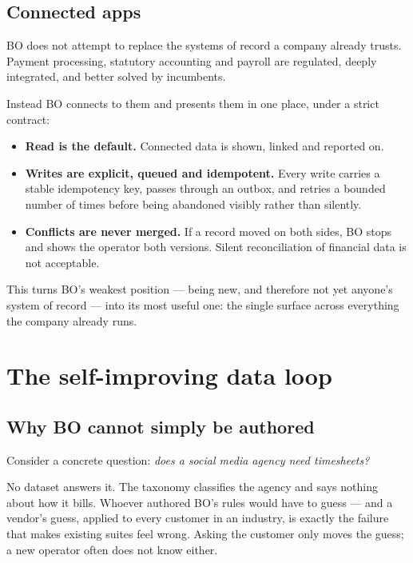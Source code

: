 \documentclass[11pt,a4paper]{article}
\begin{document}
\subsection{Connected apps}

BO does not attempt to replace the systems of record a company already trusts. Payment processing,
statutory accounting and payroll are regulated, deeply integrated, and better solved by incumbents.

Instead BO connects to them and presents them in one place, under a strict contract:

\begin{itemize}[leftmargin=1.4em,itemsep=2pt]
  \item \textbf{Read is the default.} Connected data is shown, linked and reported on.
  \item \textbf{Writes are explicit, queued and idempotent.} Every write carries a stable
        idempotency key, passes through an outbox, and retries a bounded number of times before
        being abandoned visibly rather than silently.
  \item \textbf{Conflicts are never merged.} If a record moved on both sides, BO stops and shows the
        operator both versions. Silent reconciliation of financial data is not acceptable.
\end{itemize}

This turns BO's weakest position --- being new, and therefore not yet anyone's system of record ---
into its most useful one: the single surface across everything the company already runs.

\section{The self-improving data loop}
\label{sec:loop}

\subsection{Why BO cannot simply be authored}

Consider a concrete question: \emph{does a social media agency need timesheets?}

No dataset answers it. The taxonomy classifies the agency and says nothing about how it bills.
Whoever authored BO's rules would have to guess --- and a vendor's guess, applied to every customer
in an industry, is exactly the failure that makes existing suites feel wrong. Asking the customer
only moves the guess; a new operator often does not know either.
\end{document}
